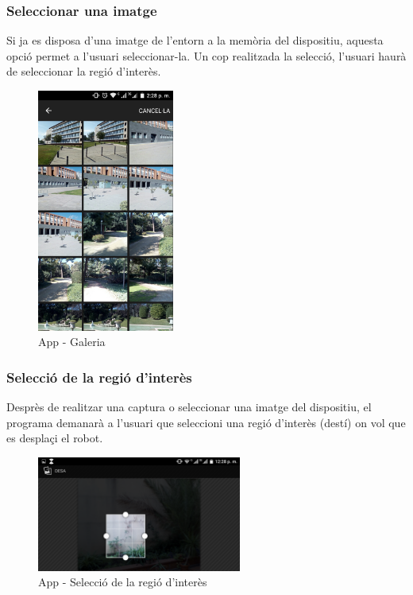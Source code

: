 	\subsubsection{Seleccionar una imatge}
	Si ja es disposa d'una imatge de l'entorn a la memòria del dispositiu, aquesta opció permet a l'usuari seleccionar-la. Un cop realitzada la selecció, l'usuari haurà de seleccionar la regió d'interès.
		\begin{figure}[H]
			\centering
			\includegraphics[width=0.4\textwidth]{images/gallery}
			\caption{App - Galeria}
		\end{figure}
	\subsubsection{Selecció de la regió d'interès}
		Desprès de realitzar una captura o seleccionar una imatge del dispositiu, el programa demanarà a l'usuari que seleccioni una regió d'interès (destí) on vol que es desplaçi el robot.
		\begin{figure}[H]
			\centering
			\includegraphics[width=0.6\textwidth]{images/crop}
			\caption{App - Selecció de la regió d'interès}
		\end{figure}
